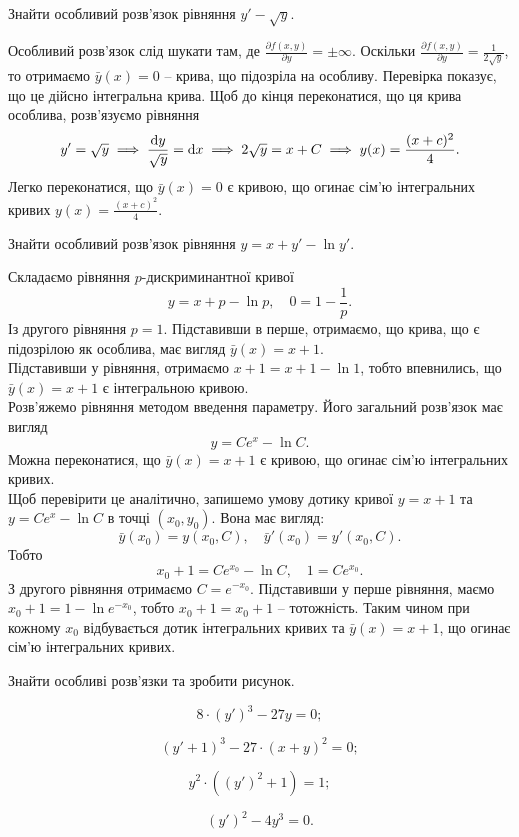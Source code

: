 \begin{example}
	Знайти особливий розв’язок рівняння $y' - \sqrt{y}$.
\end{example}
\begin{solution}
	Особливий розв’язок слід шукати там, де $\frac{\partial f(x,y)}{\partial y}=\pm\infty$. Оскільки $\frac{\partial f(x,y)}{\partial y}=\frac{1}{2\sqrt{y}}$, то отримаємо $\bar y(x)=0$ -- крива, що підозріла на особливу. Перевірка показує, що це дійсно інтегральна крива. Щоб до кінця переконатися, що ця крива особлива, розв’язуємо рівняння \[y'=\sqrt{y}\implies \frac{\mathop{}\!\mathrm{d} y}{\sqrt{y}}=\mathop{}\!\mathrm{d} x\implies 2\sqrt{y}=x+C\implies y(x)=\frac{(x+c)^2}{4}.\]
	Легко переконатися, що $\bar y(x)=0$ є кривою, що огинає сім’ю інтегральних кривих $y(x)=\frac{(x+c)^2}{4}$. 
\end{solution}

\begin{example}
	Знайти особливий розв’язок рівняння $y = x + y' - \ln y'$.
\end{example}
\begin{solution}
	Складаємо рівняння $p$-дискриминантної кривої \[ y = x + p - \ln p, \quad 0 = 1 - \frac{1}{p}.\] Із другого рівняння $p=1$. Підставивши в перше, отримаємо, що крива, що є підозрілою як особлива, має вигляд $\bar y(x)=x+1$. \\

	Підставивши у рівняння, отримаємо $x + 1=x+1-\ln 1$, тобто впевнились, що $\bar y(x)=x+1$ є інтегральною кривою. \\

	Роз\-в'яж\-е\-мо рівняння методом введення параметру. Його загальний роз\-в'яз\-ок має вигляд \[y=Ce^x-\ln C.\] Можна переконатися, що $\bar y(x)=x+1$ є кривою, що огинає сім'ю інтегральних кривих. \\

	Щоб перевірити це аналітично, запишемо умову дотику кривої $y=x+1$ та $y=Ce^x-\ln C$ в точці $(x_0,y_0)$. Вона має вигляд: \[ \bar y(x_0) = y(x_0, C), \quad \bar{y}'(x_0) = y'(x_0,C).\] Тобто \[x_0+1=Ce^{x_0}-\ln C, \quad 1 = Ce^{x_0}.\] З другого рівняння отримаємо $C = e^{-x_0}$. Підставивши у перше рівняння, маємо $x_0 + 1 = 1 - \ln e^{-x_0}$, тобто $x_0+1=x_0+1$ -- тотожність. Таким чином при кожному $x_0$ відбувається дотик інтегральних кривих та $\bar y(x)=x+1$, що огинає сім’ю інтегральних кривих.
\end{solution}

Знайти особливі розв’язки та зробити рисунок.
\begin{multicols}{2}
\begin{problem}
	\[8\cdot(y')^3-27y=0;\]
\end{problem}
\begin{problem}
	\[(y'+1)^3-27\cdot(x+y)^2=0;\]
\end{problem}
\begin{problem}
	\[y^2\cdot((y')^2+1)=1;\]
\end{problem}
\begin{problem}
	\[(y')^2-4y^3=0.\]
\end{problem}
\end{multicols}
